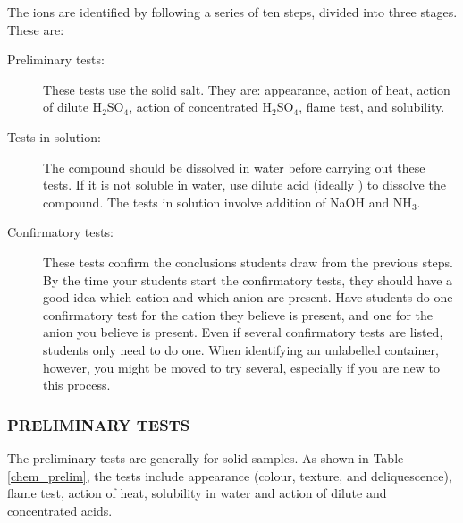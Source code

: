 \noindent The ions are identified by following a series of ten steps, divided into three stages. These are:
\begin{description}
	\item[Preliminary tests:] These tests use the solid salt. They are: appearance, action of heat, action of dilute H$_{2}$SO$_{4}$, action of concentrated H$_{2}$SO$_{4}$, flame test, and solubility.
	\item[Tests in solution:] The compound should be dissolved in water before carrying out these tests. If it is not soluble in water, use dilute acid (ideally ) to dissolve the compound. The tests in solution involve addition of NaOH and NH$_{3}$.
	\item[Confirmatory tests:] These tests confirm the conclusions students draw from the previous steps. By the time your students start the confirmatory tests, they should have a good idea which cation and which anion are present. Have students do one confirmatory test for the cation they believe is present, and one for the anion you believe is present. Even if several confirmatory tests are listed, students only need to do one. When identifying an unlabelled container, however, you might be moved to try several, especially if you are new to this process.
\end{description}

\subsubsection{PRELIMINARY TESTS}
\noindent The preliminary tests are generally for solid samples. As shown in Table \ref{chem_prelim}, the tests include appearance (colour, texture, and deliquescence), flame test, action of heat, solubility in water and action of dilute and concentrated acids. \\



